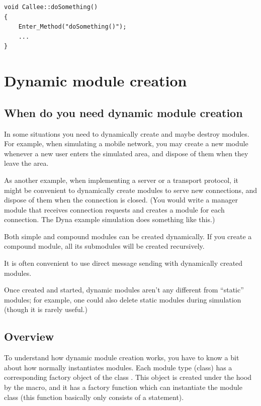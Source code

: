 \begin{verbatim}
void Callee::doSomething()
{
    Enter_Method("doSomething()");
    ...
}
\end{verbatim}



\section{Dynamic module creation}
\label{ch:simple-modules:dynamic-module-creation}

\subsection{When do you need dynamic module creation}

In some situations you need to dynamically create and maybe destroy
modules. For example, when simulating a mobile network,
you may create a new module whenever a new user enters
the simulated area, and dispose of them when they leave the area.

As another example, when implementing a server or a transport
protocol, it might be convenient to dynamically create modules
to serve new connections, and dispose of them when the connection
is closed. (You would write a manager module that receives connection
requests and creates a module for each connection.
The Dyna example simulation does something like this.)

Both simple and compound modules can be created dynamically.
If you create a compound module, all its submodules will be created
recursively.

It is often convenient to use direct message sending with dynamically
created modules.

Once created and started, dynamic modules aren't any different from
``static'' modules; for example, one could also delete static modules
during simulation (though it is rarely useful.)


\subsection{Overview}


To understand how dynamic module creation works, you have to know a
bit about how normally {\opp} instantiates modules. Each module type
(class) has a corresponding factory object of the class
. This object is created under the hood by the
 macro, and it has a factory
function which can instantiate the module
class (this function basically only consists of a  statement).

